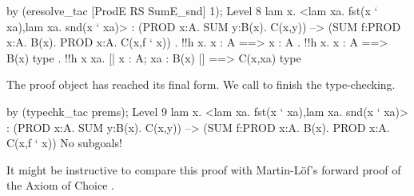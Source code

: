 \begin{ttbox}
by (eresolve_tac [ProdE RS SumE_snd] 1);
{\out Level 8}
{\out lam x. <lam xa. fst(x ` xa),lam xa. snd(x ` xa)>}
{\out : (PROD x:A. SUM y:B(x). C(x,y)) -->}
{\out   (SUM f:PROD x:A. B(x). PROD x:A. C(x,f ` x))}
\ttbreak
{. !!h x. x : A ==> x : A}
{. !!h x. x : A ==> B(x) type}
{. !!h x xa. [| x : A; xa : B(x) |] ==> C(x,xa) type}
\end{ttbox}
The proof object has reached its final form.  We call 
to finish the type-checking.
\begin{ttbox}
by (typechk_tac prems);
{\out Level 9}
{\out lam x. <lam xa. fst(x ` xa),lam xa. snd(x ` xa)>}
{\out : (PROD x:A. SUM y:B(x). C(x,y)) -->}
{\out   (SUM f:PROD x:A. B(x). PROD x:A. C(x,f ` x))}
{\out No subgoals!}
\end{ttbox}
It might be instructive to compare this proof with Martin-L\"of's forward
proof of the Axiom of Choice \cite[page~50]{martinlof84}.

